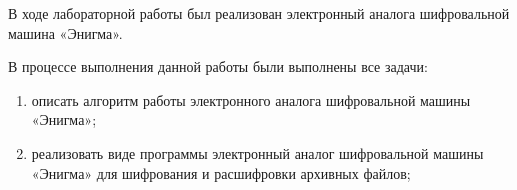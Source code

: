
В ходе лабораторной работы был реализован электронный аналога шифровальной машина «Энигма».

В процессе выполнения данной работы были выполнены все задачи:
\begin{enumerate}
	\item описать алгоритм работы электронного аналога шифровальной машины «Энигма»;
	\item реализовать виде программы электронный аналог шифровальной машины «Энигма» для шифрования и расшифровки архивных файлов;
\end{enumerate}
